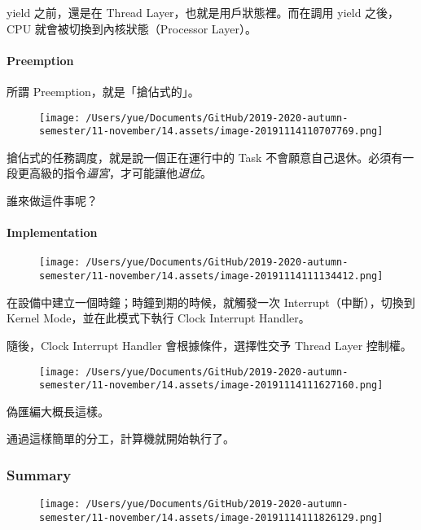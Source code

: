 \documentclass[
]{article}
\begin{document}
yield 之前，還是在 Thread Layer，也就是用戶狀態裡。而在調用 yield
之後，CPU 就會被切換到內核狀態（Processor Layer）。

\hypertarget{header-n15}{%
\paragraph{Preemption}\label{header-n15}}

所謂 Preemption，就是「搶佔式的」。

\begin{figure}
\centering
\texttt{[image: /Users/yue/Documents/GitHub/2019-2020-autumn-semester/11-november/14.assets/image-20191114110707769.png]}
\caption{}
\end{figure}

搶佔式的任務調度，就是說一個正在運行中的 Task
不會願意自己退休。必須有一段更高級的指令\emph{逼宮}，才可能讓他\emph{退位}。

誰來做這件事呢？

\hypertarget{header-n20}{%
\paragraph{Implementation}\label{header-n20}}

\begin{figure}
\centering
\texttt{[image: /Users/yue/Documents/GitHub/2019-2020-autumn-semester/11-november/14.assets/image-20191114111134412.png]}
\caption{}
\end{figure}

在設備中建立一個時鐘；時鐘到期的時候，就觸發一次
Interrupt（中斷），切換到 Kernel Mode，並在此模式下執行 Clock Interrupt
Handler。

隨後，Clock Interrupt Handler 會根據條件，選擇性交予 Thread Layer
控制權。

\begin{figure}
\centering
\texttt{[image: /Users/yue/Documents/GitHub/2019-2020-autumn-semester/11-november/14.assets/image-20191114111627160.png]}
\caption{}
\end{figure}

偽匯編大概長這樣。

通過這樣簡單的分工，計算機就開始執行了。

\hypertarget{header-n27}{%
\subsubsection{Summary}\label{header-n27}}

\begin{figure}
\centering
\texttt{[image: /Users/yue/Documents/GitHub/2019-2020-autumn-semester/11-november/14.assets/image-20191114111826129.png]}
\caption{}
\end{figure}
\end{document}
